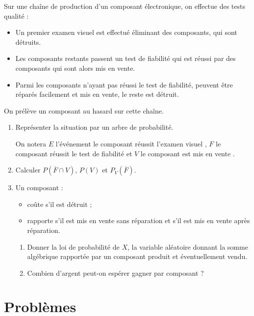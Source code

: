 \documentclass[12pt,a4paper,french]{article}
\begin{document}
\begin{question}
    Sur une chaîne de production d'un composant électronique, on effectue des tests qualité :
  \begin{itemize}
    \item Un premier examen visuel est effectué éliminant  des composants, qui sont détruits.
    \item Les composants restants passent un test de fiabilité qui est réussi par  des composants qui sont alors mis en vente.
    \item Parmi les composants n'ayant pas réussi le test de fiabilité,  peuvent être réparés facilement et mis en vente, le reste est détruit.
  \end{itemize}
  On prélève un composant au hasard sur cette chaîne.
  \begin{enumerate}
    \item Représenter la situation par un arbre de probabilité.

      On notera $E$ l'événement \og le composant réussit l'examen
      visuel \fg{}, $F$ \og le composant réussit le test de fiabilité
      \fg{} et $V$ \og le composant est mis en vente \fg{}.
    \item Calculer $P\left(\overline{F}\cap V\right)$, $P(V)$ et
      $P_V\left(\overline{F}\right)$.
    \item Un composant :
        \begin{itemize}
        \item coûte  s'il est détruit ;
        \item rapporte  s'il est mis en vente sans
          réparation et  s'il est mis en vente après
          réparation.
        \end{itemize}
        \vspace{-\baselineskip}\begin{enumerate}
        \item Donner la loi de probabilité de $X$, la variable
          aléatoire donnant la somme algébrique rapportée par un
          composant produit et éventuellement vendu.
        \item Combien d'argent peut-on \og espérer \fg{} gagner par
          composant ?
        \end{enumerate}
  \end{enumerate}
\end{question}

\section{Problèmes}

\newpage


\bigskip

\printsolutions
\end{document}
